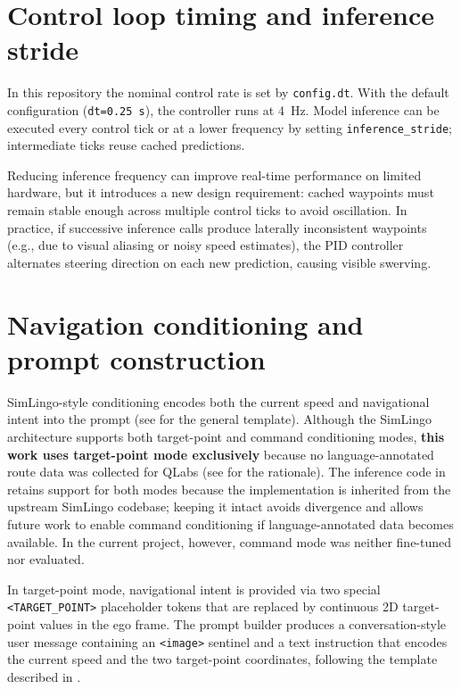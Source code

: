 \section{Control loop timing and inference stride}
\label{sec:timing-inference-stride}
In this repository the nominal control rate is set by \texttt{config.dt}. With the default configuration (\texttt{dt=0.25~s}), the controller runs at \SI{4}{Hz}. Model inference can be executed every control tick or at a lower frequency by setting \texttt{inference\_stride}; intermediate ticks reuse cached predictions.

Reducing inference frequency can improve real-time performance on limited hardware, but it introduces a new design requirement: cached waypoints must remain stable enough across multiple control ticks to avoid oscillation. In practice, if successive inference calls produce laterally inconsistent waypoints (e.g., due to visual aliasing or noisy speed estimates), the PID controller alternates steering direction on each new prediction, causing visible swerving.

\section{Navigation conditioning and prompt construction}
\label{sec:prompt-construction-inference}
SimLingo-style conditioning encodes both the current speed and navigational intent into the prompt (see  for the general template). Although the SimLingo architecture supports both target-point and command conditioning modes, \textbf{this work uses target-point mode exclusively} because no language-annotated route data was collected for QLabs (see  for the rationale). The inference code in  retains support for both modes because the implementation is inherited from the upstream SimLingo codebase; keeping it intact avoids divergence and allows future work to enable command conditioning if language-annotated data becomes available. In the current project, however, command mode was neither fine-tuned nor evaluated.

In target-point mode, navigational intent is provided via two special \texttt{<TARGET\_POINT>} placeholder tokens that are replaced by continuous 2D target-point values in the ego frame. The prompt builder produces a conversation-style user message containing an \texttt{<image>} sentinel and a text instruction that encodes the current speed and the two target-point coordinates, following the template described in .

